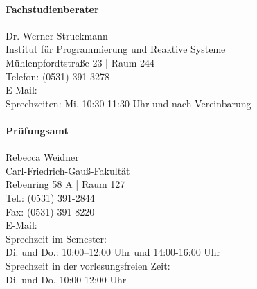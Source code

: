 	\paragraph{Fachstudienberater}
		Dr. Werner Struckmann\\
		Institut für Programmierung und Reaktive Systeme\\
		Mühlenpfordtstraße 23 | Raum 244\\
		Telefon: (0531) 391-3278\\
		E-Mail: \\
		Sprechzeiten: Mi. 10:30-11:30 Uhr und nach  Vereinbarung

	\paragraph{Prüfungsamt}
		Rebecca Weidner\\
		Carl-Friedrich-Gauß-Fakultät\\
		Rebenring 58 A | Raum 127\\
		Tel.: (0531) 391-2844\\
		Fax: (0531) 391-8220\\
		E-Mail: \\
		Sprechzeit im Semester:\\
		Di. und Do.: 10:00–12:00 Uhr und 14:00-16:00 Uhr\\
		Sprechzeit in der vorlesungsfreien Zeit:\\
		Di. und Do. 10:00-12:00 Uhr
